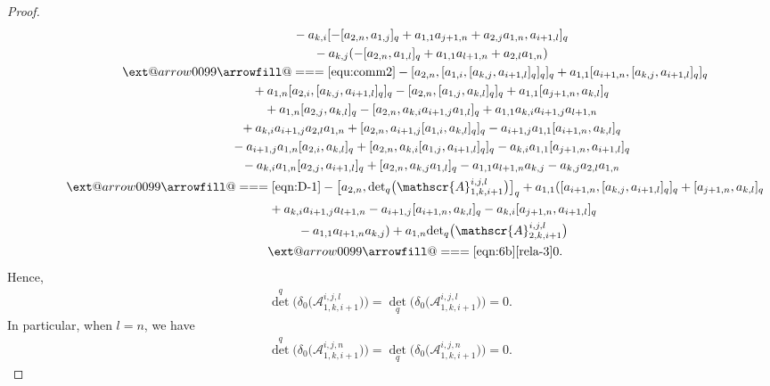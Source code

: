 \documentclass[10pt,a4paper]{amsart}
\makeatletter
\def\x@arrow{\DOTSB\Relbar}
\def\xlongequalsignfill@{\arrowfill@\x@arrow\Relbar\x@arrow}
\providecommand{\xlongequal}[2][]{%
	\ext@arrow 0099\xlongequalsignfill@{#1}{#2}}
\numberwithin{equation}{section}
\def\d{\delta}
\def\A{\mathscr{A}}
\makeatother
\begin{document}
\begin{proof}
\begin{gather*}
 \phantom{\qquad\qquad\qquad\ \, }{} -a_{k,i} [- [a_{2,n},a_{1,j} ]_q+a_{1,1}a_{j+1,n}+a_{2,j}a_{1,n}, a_{i+1,l} ]_q\\
 \phantom{\qquad\qquad\qquad\ \, }{} -a_{k,j} (- [a_{2,n},a_{1,l} ]_q+a_{1,1}a_{l+1,n}+a_{2,l}a_{1,n} ) \\
\qquad\qquad \xlongequal{\eqref{equ:comm2}} - [a_{2,n}, [a_{1,i}, [a_{k,j}, a_{i+1,l} ]_q ]_q ]_q +a_{1,1} [a_{i+1,n}, [a_{k,j}, a_{i+1,l} ]_q ]_q \\
 \phantom{\qquad\qquad\qquad\ \,}{} +a_{1,n} [a_{2,i}, [a_{k,j}, a_{i+1,l} ]_q ]_q - [a_{2,n}, [a_{1,j}, a_{k,l} ]_q ]_q +a_{1,1} [a_{j+1,n},a_{k,l} ]_q\\
 \phantom{\qquad\qquad\qquad\ \,}{} +a_{1,n} [a_{2,j}, a_{k,l} ]_q - [a_{2,n},a_{k,i}a_{i+1,j}a_{1,l} ]_q +a_{1,1}a_{k,i}a_{i+1,j}a_{l+1,n} \\
 \phantom{\qquad\qquad\qquad\ \,}{} +a_{k,i}a_{i+1,j}a_{2,l}a_{1,n} + [a_{2,n},a_{i+1,j} [a_{1,i}, a_{k,l} ]_q ]_q -a_{i+1,j}a_{1,1} [a_{i+1,n}, a_{k,l} ]_q\\
 \phantom{\qquad\qquad\qquad\ \,}{} -a_{i+1,j}a_{1,n} [a_{2,i}, a_{k,l} ]_q + [a_{2,n},a_{k,i} [a_{1,j}, a_{i+1,l} ]_q ]_q-a_{k,i}a_{1,1} [a_{j+1,n}, a_{i+1,l} ]_q \\
 \phantom{\qquad\qquad\qquad\ \,}{} -a_{k,i}a_{1,n} [a_{2,j}, a_{i+1,l} ]_q + [a_{2,n},a_{k,j}a_{1,l} ]_q-a_{1,1}a_{l+1,n}a_{k,j}-a_{k,j}a_{2,l}a_{1,n}\\
\qquad\qquad \xlongequal{\eqref{eqn:D-1}} - \bigl[a_{2,n},{\det}_q \bigl(\A_{1,k,i+1}^{i,j,l} \bigr) \bigr]_q +a_{1,1} ( [a_{i+1,n}, [a_{k,j}, a_{i+1,l} ]_q ]_q + [a_{j+1,n},a_{k,l} ]_q \\
 \phantom{\qquad\qquad\qquad\ \, \ }{} +a_{k,i}a_{i+1,j}a_{l+1,n} -a_{i+1,j} [a_{i+1,n}, a_{k,l} ]_q-a_{k,i} [a_{j+1,n}, a_{i+1,l} ]_q\\
 \phantom{\qquad\qquad\qquad\ \,\ }{} -a_{1,1}a_{l+1,n}a_{k,j} ) +a_{1,n}{\det}_q \bigl(\A_{2,k,i+1}^{i,j,l} \bigr)\\
\qquad\qquad \xlongequal[\eqref{eqn:6b}]{\eqref{rela-3}}0.
\end{gather*}
Hence,
\begin{gather*}
{\det}^q \bigl(\d_0 \bigl(\A_{1,k,i+1}^{i,j,l}\bigr) \bigr) ={\det}_q \bigl(\d_0 \bigl(\A_{1,k,i+1}^{i,j,l}\bigr) \bigr)=0.
\end{gather*}
In particular, when $l=n$, we have
\begin{gather*}
{\det}^q \bigl(\d_0 \bigl(\A_{1,k,i+1}^{i,j,n} \bigr) \bigr) ={\det}_q \bigl(\d_0 \bigl(\A_{1,k,i+1}^{i,j,n} \bigr) \bigr)=0.

\end{gather*}
\end{proof}
\end{document}
